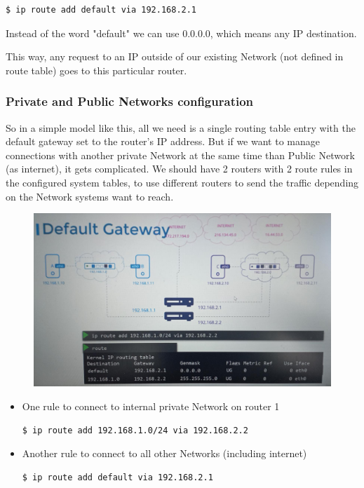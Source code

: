 \documentclass{article}
\newenvironment{blocktemplate}[1]{%
    \tcolorbox[beamer,%
    noparskip,breakable,
    colframe=Blue,%
    colbacklower=LimeGreen!75!LightGreen,%
    title=#1]}%
    {\endtcolorbox}
\newenvironment{codetemplate}[1][]{%
  \mybasecolorbox[#1]
  \itshape
}{%
  \endmybasecolorbox
}
\begin{document}
\begin{codetemplate}{}
\begin{verbatim}
$ ip route add default via 192.168.2.1
\end{verbatim}
\end{codetemplate}

\begin{blocktemplate}{NOTE}
Instead of the word "default" we can use 0.0.0.0, which means any IP destination.
\end{blocktemplate}

This way, any request to an IP outside of our existing Network (not defined in route table) goes to this particular router. 

\subsubsection{Private and Public Networks configuration}

So in a simple model like this, all we need is a single routing table entry with the default gateway set to the router's IP address. But if we want to manage connections with another private Network at the same time than Public Network (as internet), it gets complicated. We should have 2 routers with 2 route rules in the configured system tables, to use different routers to send the traffic depending on the Network systems want to reach.

\begin{figure}[H]
    \includegraphics[width=\textwidth]{pictures/ntw5.png}
\end{figure}

\begin{itemize}
    \item One rule to connect to internal private Network on router 1
\begin{codetemplate}{}
\begin{verbatim}
$ ip route add 192.168.1.0/24 via 192.168.2.2
\end{verbatim}
\end{codetemplate}

    \item Another rule to connect to all other Networks (including internet)
\begin{codetemplate}{}
\begin{verbatim}
$ ip route add default via 192.168.2.1
\end{verbatim}
\end{codetemplate}
\end{itemize}
\end{document}
